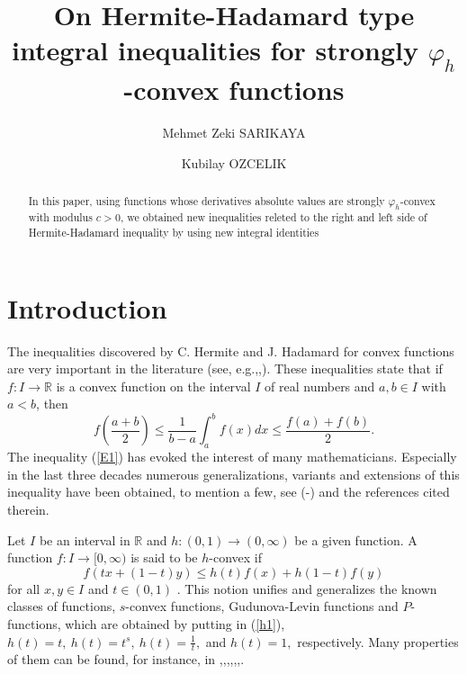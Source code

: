 \documentclass{amsart}
\theoremstyle{plain}
\numberwithin{equation}{section}
\begin{document}
\title[On Hermite-Hadamard type integral inequalities]{On Hermite-Hadamard
type integral inequalities for strongly $\varphi _{h}$-convex functions}
\author{Mehmet Zeki SARIKAYA}
\address{Department of Mathematics, \ Faculty of Science and Arts, D\"{u}zce
University, D\"{u}zce-TURKEY}
\author{Kubilay OZCELIK}
\address{Department of Mathematics, \ Faculty of Science and Arts, D\"{u}zce
University, D\"{u}zce-TURKEY}

\begin{abstract}
In this paper,  using functions whose derivatives absolute values are
strongly $\varphi _{h}$-convex with modulus $c>0$, we obtained new
inequalities releted to the right and left side of Hermite-Hadamard
inequality by using new integral identities
\end{abstract}

\maketitle

\section{Introduction}

The inequalities discovered by C. Hermite and J. Hadamard for convex
functions are very important in the literature (see, e.g.,\cite{dragomir1},\cite[p.137]{pecaric}). These inequalities state that if $f:I\rightarrow 
\mathbb{R}$ is a convex function on the interval $I$ of real numbers and $a,b\in I$ with $a<b$, then 
\begin{equation}
f\left( \frac{a+b}{2}\right) \leq \frac{1}{b-a}\int_{a}^{b}f(x)dx\leq \frac{f\left( a\right) +f\left( b\right) }{2}.  \label{E1}
\end{equation}The inequality (\ref{E1}) has evoked the interest of many mathematicians.
Especially in the last three decades numerous generalizations, variants and
extensions of this inequality have been obtained, to mention a few, see (\cite{bakula}-\cite{set2}) and the references cited therein.

Let $I$ be an interval in $\mathbb{R}$ and $h:(0,1)\rightarrow (0,\infty )$
be a given function. A function $f:I\rightarrow \lbrack 0,\infty )$ is said
to be $h$-convex if\begin{equation}
f(tx+(1-t)y)\leq h(t)f(x)+h(1-t)f(y)  \label{h1}
\end{equation}for all $x,y\in I$ and $t\in \left( 0,1\right) $ \cite{varosanec}$.$ This
notion unifies and generalizes the known classes of functions, $s$-convex
functions, Gudunova-Levin functions and $P$-functions, which are obtained by
putting in (\ref{h1}), $h(t)=t,\ h(t)=t^{s},\ h(t)=\frac{1}{t},$ and $h(t)=1, $ respectively. Many properties of them can be found, for instance,
in \cite{dragomir3},\cite{dragomir4},\cite{angu},\cite{sarikaya},\cite{sarikaya1},\cite{sarikaya3},\cite{varosanec}.
\end{document}
